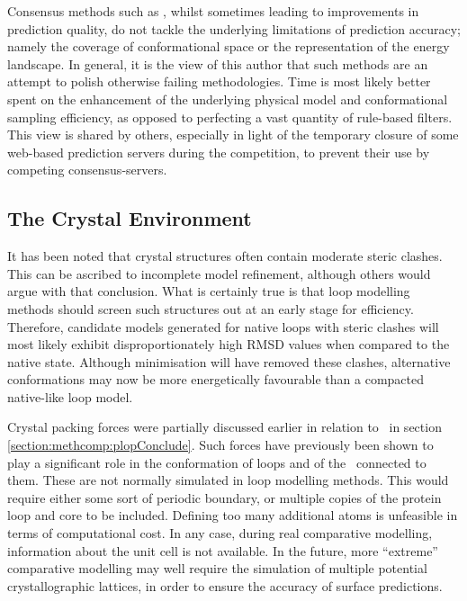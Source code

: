 Consensus methods such as \coda, whilst sometimes leading to improvements in prediction quality, do not tackle the underlying limitations of prediction accuracy; namely the coverage of conformational space or the representation of the energy landscape. In general, it is the view of this author that such methods are an attempt to polish otherwise failing  methodologies.
Time is most likely better spent on the enhancement of the underlying physical model and conformational sampling efficiency, as opposed to perfecting a vast quantity of rule-based filters.
This view is shared by others, especially in light of the temporary closure of some web-based prediction servers during the  competition, to prevent their use by competing consensus-servers.

\subsection{The Crystal Environment}

It has been noted\cite{METHOD:Plop} that crystal structures often contain moderate steric clashes. This can be ascribed to incomplete model refinement, although others would argue with that conclusion. What is certainly true is that loop modelling methods should screen such structures out at an early stage for efficiency. Therefore, candidate models generated for native loops with steric clashes will most likely exhibit disproportionately high RMSD values when compared to the native state. Although minimisation will have removed these clashes, alternative conformations may now be more energetically favourable than a compacted native-like loop model.

Crystal packing forces were partially discussed earlier in relation to \plop\ in section \ref{section:methcomp:plopConclude}. Such forces have previously been shown to play a significant role in the conformation of loops and of the \sidechains\ connected to them\cite{METHOD:Plop:Jacobson2002A}. These are not normally simulated in loop modelling methods. This would require either some sort of periodic boundary, or multiple copies of the protein loop and core to be included. Defining too many additional atoms is unfeasible in terms of computational cost. In any case, during real comparative modelling, information about the unit cell is not available. In the future, more ``extreme''  comparative modelling may well require the simulation of multiple potential crystallographic lattices, in order to ensure the accuracy of surface predictions. 


